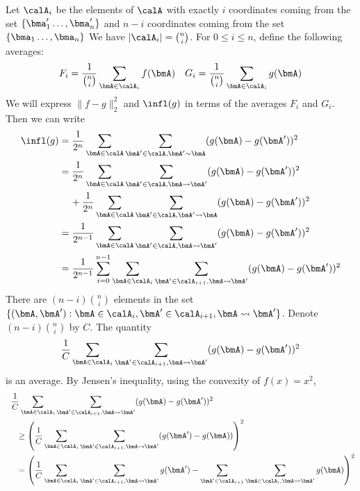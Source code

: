 Let $\calA_i$ be the elements of $\calA$ with exactly $i$ coordinates coming from the set 
$\{\bma_1' \ldots, \bma_n'\}$ 
and $n-i$ coordinates coming from the set 
$\{\bma_1 \ldots, \bma_n\}$
We have $|\calA_i| = \binom{n}{i}$. For $0 \leq i \leq n$, define the following averages:
\begin{align*}
    F_i = \frac{1}{\binom{n}{i}} \sum_{\bmA \in \calA_i} f(\bmA) & & 
    G_i = \frac{1}{\binom{n}{i}} \sum_{\bmA \in \calA_i} g(\bmA)
\end{align*}
We will express $\|f-g\|_2^2$ and $\infl(g)$ in terms of the averages $F_i$ and $G_i$. 
Then we can write
\begin{align}
    \infl(g) &= \frac{1}{2^n} \sum_{\bmA \in \calA} \sum_{\bmA' \in \calA, \bmA' \sim \bmA} (g(\bmA) - g(\bmA'))^2 \nonumber \\
    &= \frac{1}{2^n} \sum_{\bmA \in \calA} \sum_{\bmA' \in \calA, \bmA \leadsto
    \bmA'} (g(\bmA) - g(\bmA'))^2 \nonumber \\
    &\hspace{4mm} + \frac{1}{2^n} \sum_{\bmA \in \calA} \sum_{\bmA' \in \calA,
    \bmA' \leadsto \bmA} (g(\bmA) - g(\bmA'))^2 \nonumber \\
    &= \frac{1}{2^{n-1}} \sum_{\bmA \in \calA} \sum_{\bmA' \in \calA, \bmA \leadsto \bmA'} (g(\bmA) - g(\bmA'))^2  \nonumber \\
    &= \frac{1}{2^{n-1}} \sum_{i=0}^{n-1} \sum_{\bmA \in \calA_i} \sum_{\bmA' \in \calA_{i+1}, \bmA \leadsto \bmA'} (g(\bmA) - g(\bmA'))^2 \label{eq:infl-rep}
\end{align}
There are $(n-i)\binom{n}{i}$ elements in the set $\{(\bmA,\bmA') : \bmA \in \calA_i, \bmA' \in \calA_{i+1}, \bmA \leadsto \bmA'\}$. Denote $(n-i)\binom{n}{i}$ by $C$. 
The quantity
\begin{equation}\label{eq:infl-piece}
\frac{1}{C} \sum_{\bmA \in \calA_i} \sum_{\bmA' \in \calA_{i+1}, \bmA \leadsto \bmA'} (g(\bmA) - g(\bmA'))^2
\end{equation}
is an average. By Jensen's inequality, using the convexity of $f(x) = x^2$,
\begin{align}
    &\:~\frac{1}{C} \sum_{\bmA \in \calA_i} \sum_{\bmA' \in \calA_{i+1}, \bmA
    \leadsto \bmA'} (g(\bmA) - g(\bmA'))^2 \\
    &\:\hspace{1em}\geq \left( \frac{1}{C} \sum_{\bmA \in \calA_i} \sum_{\bmA'
  \in \calA_{i+1}, \bmA \leadsto \bmA'} (g(\bmA') - g(\bmA)) \right)^2 \nonumber \\
    &\:\hspace{1em} = \left( \frac{1}{C} \sum_{\bmA \in \calA_i} \sum_{\bmA' \in \calA_{i+1}, \bmA \leadsto \bmA'} g(\bmA') - \sum_{\bmA' \in \calA_{i+1}} \sum_{\bmA \in \calA_{i}, \bmA \leadsto \bmA'} g(\bmA) \right)^2 \label{eq:infl-jensen}
\end{align}
